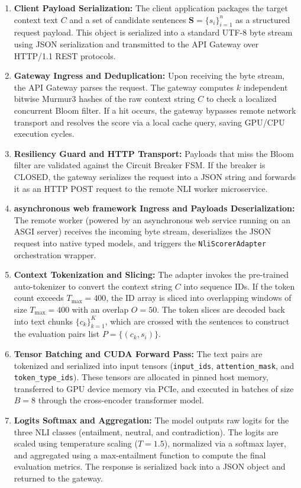 \documentclass[11pt,a4paper]{article}
\theoremstyle{plain}
\theoremstyle{definition}
\theoremstyle{remark}
\begin{document}
\begin{enumerate}
    \item \textbf{Client Payload Serialization:} The client application packages the target context text $C$ and a set of candidate sentences $\mathbf{S} = \{s_i\}_{i=1}^n$ as a structured request payload. This object is serialized into a standard UTF-8 byte stream using JSON serialization and transmitted to the API Gateway over HTTP/1.1 REST protocols.
    \item \textbf{Gateway Ingress and Deduplication:} Upon receiving the byte stream, the API Gateway parses the request. The gateway computes $k$ independent bitwise Murmur3 hashes of the raw context string $C$ to check a localized concurrent Bloom filter. If a hit occurs, the gateway bypasses remote network transport and resolves the score via a local cache query, saving GPU/CPU execution cycles.
    \item \textbf{Resiliency Guard and HTTP Transport:} Payloads that miss the Bloom filter are validated against the Circuit Breaker FSM. If the breaker is CLOSED, the gateway serializes the request into a JSON string and forwards it as an HTTP POST request to the remote NLI worker microservice.
    \item \textbf{asynchronous web framework Ingress and Payloads Deserialization:} The remote worker (powered by an asynchronous web service running on an ASGI server) receives the incoming byte stream, deserializes the JSON request into native typed models, and triggers the \texttt{NliScorerAdapter} orchestration wrapper.
    \item \textbf{Context Tokenization and Slicing:} The adapter invokes the pre-trained auto-tokenizer to convert the context string $C$ into sequence IDs. If the token count exceeds $T_{\max} = 400$, the ID array is sliced into overlapping windows of size $T_{\max} = 400$ with an overlap $O = 50$. The token slices are decoded back into text chunks $\{c_k\}_{k=1}^K$, which are crossed with the sentences to construct the evaluation pairs list $P = \{(c_k, s_i)\}$.
    \item \textbf{Tensor Batching and CUDA Forward Pass:} The text pairs are tokenized and serialized into input tensors (\texttt{input\_ids}, \texttt{attention\_mask}, and \texttt{token\_type\_ids}). These tensors are allocated in pinned host memory, transferred to GPU device memory via PCIe, and executed in batches of size $B = 8$ through the cross-encoder transformer model.
    \item \textbf{Logits Softmax and Aggregation:} The model outputs raw logits for the three NLI classes (entailment, neutral, and contradiction). The logits are scaled using temperature scaling ($T=1.5$), normalized via a softmax layer, and aggregated using a max-entailment function to compute the final evaluation metrics. The response is serialized back into a JSON object and returned to the gateway.
\end{enumerate}
\end{document}
